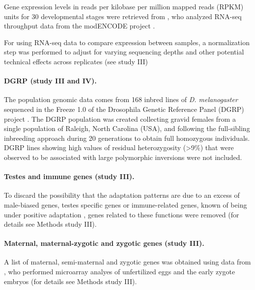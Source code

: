 Gene expression levels in reads per kilobase per million mapped reads (RPKM) units for 30 developmental stages were retrieved from \citet{Gelbart2013}, who analyzed RNA-seq throughput data from the modENCODE project \citep{Graveley2011}.

For using RNA-seq data to compare expression between samples, a normalization step was performed to adjust for varying sequencing depths and other potential technical effects across replicates (see study III)

\paragraph{DGRP (study III and IV).}

The population genomic data comes from 168 inbred lines of \textit{D. melanogaster} sequenced in the Freeze 1.0 of the Drosophila Genetic Reference Panel (DGRP) project \citep{Mackay2012}. The DGRP population was created collecting gravid females from a single population of Raleigh, North Carolina (USA), and following the full-sibling inbreeding approach during 20 generations to obtain full homozygous individuals. 
DGRP lines showing high values of residual heterozygosity (>9\%) that were observed to be associated with large polymorphic inversions \citep{Huang2014} were not included.

\paragraph{Testes and immune genes (study III).}
To discard the possibility that the adaptation patterns are due to an excess of male-biased genes, testes specific genes or immune-related genes, known of being under positive adaptation \citep{Civetta1995,Swanson2001,Artieri2009,Obbard2009}, genes related to these functions were removed (for details see Methods study III).

\paragraph{Maternal, maternal-zygotic and zygotic genes (study III).}
A list of maternal, semi-maternal and zygotic genes was obtained using data from \citet{Thomsen2010}, who performed microarray analyes of unfertilized eggs and the early zygote embryos (for details see Methods study III).